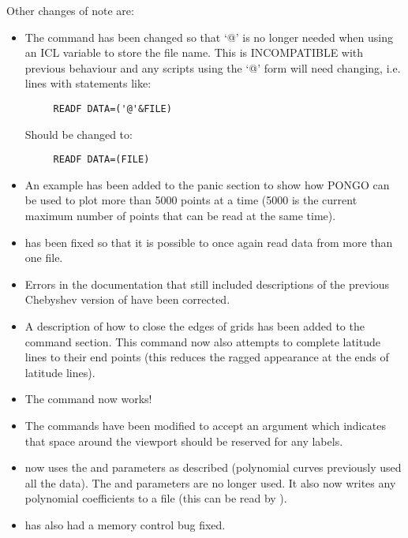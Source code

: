 Other changes of note are:
\begin{itemize}
\item The  command has been changed so that `@' is no
longer needed when using an ICL variable to store the file name. This
is INCOMPATIBLE with previous behaviour and any scripts using the `@'
form will need changing, i.e. lines with statements like:
\begin{verbatim}
     READF DATA=('@'&FILE)
\end{verbatim}
  Should be changed to:
\begin{verbatim}
     READF DATA=(FILE)
\end{verbatim}

\item An example has been added to the panic section to show how
PONGO can be used to plot more than 5000 points at a time (5000 is
the current maximum number of points that can be read at the same
time).

\item {} has been fixed so that it is possible to once again
read data from more than one file.

\item Errors in the documentation that still included descriptions of the
previous Chebyshev version of  have been corrected.

\item A description of how to close the edges of grids has been added to
the  command section. This command now also
attempts to complete latitude lines to their end points (this reduces
the ragged appearance at the ends of latitude lines).

\item The  command now works!

\item The  commands have been modified to accept an
argument which indicates that space around the viewport should be reserved for
any labels.

\item {} now uses the  and 
parameters as described (polynomial curves previously used all the
data). The  and  parameters are no longer used.
It also now writes any polynomial coefficients to a file (this can be
read by ).

\item {} has also had a memory control bug fixed.


\end{itemize}
